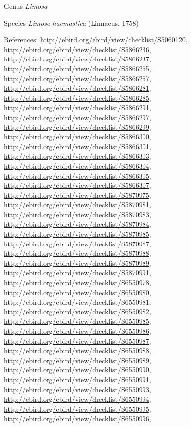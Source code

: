 \documentclass[9pt, article]{memoir}
\begin{document}
\begin{multicols}{2}
\vspace{6pt}\noindent\hspace{30pt}Genus \textit{Limosa}


\vspace{6pt}\noindent\hspace{36pt}Species \textit{Limosa haemastica} (Linnaeus, 1758)


\vspace{6pt}References: 
\url{http://ebird.org/ebird/view/checklist/S5060120}, 
\url{http://ebird.org/ebird/view/checklist/S5866236}, 
\url{http://ebird.org/ebird/view/checklist/S5866237}, 
\url{http://ebird.org/ebird/view/checklist/S5866265}, 
\url{http://ebird.org/ebird/view/checklist/S5866267}, 
\url{http://ebird.org/ebird/view/checklist/S5866281}, 
\url{http://ebird.org/ebird/view/checklist/S5866285}, 
\url{http://ebird.org/ebird/view/checklist/S5866291}, 
\url{http://ebird.org/ebird/view/checklist/S5866297}, 
\url{http://ebird.org/ebird/view/checklist/S5866299}, 
\url{http://ebird.org/ebird/view/checklist/S5866300}, 
\url{http://ebird.org/ebird/view/checklist/S5866301}, 
\url{http://ebird.org/ebird/view/checklist/S5866303}, 
\url{http://ebird.org/ebird/view/checklist/S5866304}, 
\url{http://ebird.org/ebird/view/checklist/S5866305}, 
\url{http://ebird.org/ebird/view/checklist/S5866307}, 
\url{http://ebird.org/ebird/view/checklist/S5870975}, 
\url{http://ebird.org/ebird/view/checklist/S5870981}, 
\url{http://ebird.org/ebird/view/checklist/S5870983}, 
\url{http://ebird.org/ebird/view/checklist/S5870984}, 
\url{http://ebird.org/ebird/view/checklist/S5870985}, 
\url{http://ebird.org/ebird/view/checklist/S5870987}, 
\url{http://ebird.org/ebird/view/checklist/S5870988}, 
\url{http://ebird.org/ebird/view/checklist/S5870989}, 
\url{http://ebird.org/ebird/view/checklist/S5870991}, 
\url{http://ebird.org/ebird/view/checklist/S6550978}, 
\url{http://ebird.org/ebird/view/checklist/S6550980}, 
\url{http://ebird.org/ebird/view/checklist/S6550981}, 
\url{http://ebird.org/ebird/view/checklist/S6550982}, 
\url{http://ebird.org/ebird/view/checklist/S6550985}, 
\url{http://ebird.org/ebird/view/checklist/S6550986}, 
\url{http://ebird.org/ebird/view/checklist/S6550987}, 
\url{http://ebird.org/ebird/view/checklist/S6550988}, 
\url{http://ebird.org/ebird/view/checklist/S6550989}, 
\url{http://ebird.org/ebird/view/checklist/S6550990}, 
\url{http://ebird.org/ebird/view/checklist/S6550991}, 
\url{http://ebird.org/ebird/view/checklist/S6550993}, 
\url{http://ebird.org/ebird/view/checklist/S6550994}, 
\url{http://ebird.org/ebird/view/checklist/S6550995}, 
\url{http://ebird.org/ebird/view/checklist/S6550996}, 

\end{multicols}
\end{document}
